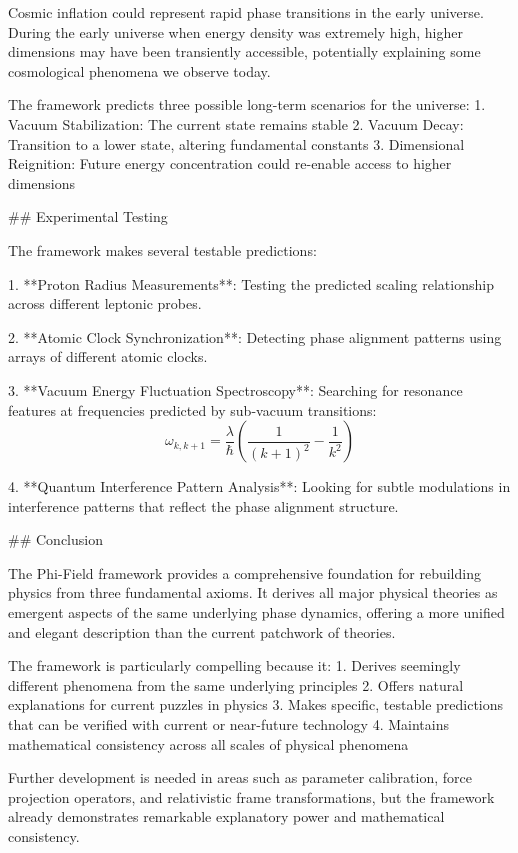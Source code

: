 Cosmic inflation could represent rapid phase transitions in the early universe. During the early universe when energy density was extremely high, higher dimensions may have been transiently accessible, potentially explaining some cosmological phenomena we observe today.

The framework predicts three possible long-term scenarios for the universe:
1. Vacuum Stabilization: The current state remains stable
2. Vacuum Decay: Transition to a lower state, altering fundamental constants
3. Dimensional Reignition: Future energy concentration could re-enable access to higher dimensions

## Experimental Testing 

The framework makes several testable predictions:

1. **Proton Radius Measurements**: Testing the predicted scaling relationship across different leptonic probes.

2. **Atomic Clock Synchronization**: Detecting phase alignment patterns using arrays of different atomic clocks.

3. **Vacuum Energy Fluctuation Spectroscopy**: Searching for resonance features at frequencies predicted by sub-vacuum transitions:
   $$\omega_{k,k+1} = \frac{\lambda}{\hbar}\left(\frac{1}{(k+1)^2} - \frac{1}{k^2}\right)$$

4. **Quantum Interference Pattern Analysis**: Looking for subtle modulations in interference patterns that reflect the phase alignment structure.

## Conclusion

The Phi-Field framework provides a comprehensive foundation for rebuilding physics from three fundamental axioms. It derives all major physical theories as emergent aspects of the same underlying phase dynamics, offering a more unified and elegant description than the current patchwork of theories.

The framework is particularly compelling because it:
1. Derives seemingly different phenomena from the same underlying principles
2. Offers natural explanations for current puzzles in physics
3. Makes specific, testable predictions that can be verified with current or near-future technology
4. Maintains mathematical consistency across all scales of physical phenomena

Further development is needed in areas such as parameter calibration, force projection operators, and relativistic frame transformations, but the framework already demonstrates remarkable explanatory power and mathematical consistency.
